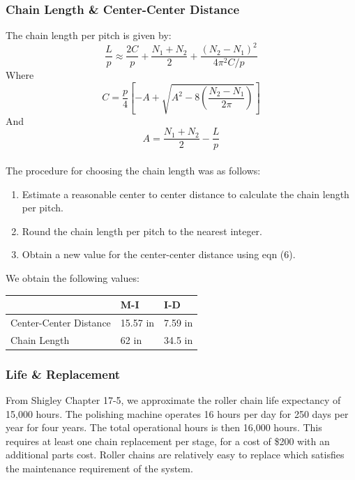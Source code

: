 \documentclass[letterpaper,12pt]{article}
\begin{document}
\subsubsection{Chain Length \& Center-Center Distance}
The chain length per pitch is given by:
\begin{equation}
\frac{L}{p} \approx \frac{2C}{p} + \frac{N_1 + N_2}{2} + \frac{(N_2 - N_1)^2}{4 \pi^2 C/p}
\end{equation}
Where
\begin{equation}
    C = \frac{p}{4}\left[-A + \sqrt{A^2 - 8\left(\frac{N_2 - N_1}{2 \pi}\right)}\right]
\end{equation}
And
\begin{equation}
    A = \frac{N_1 + N_2}{2} - \frac{L}{p}
\end{equation}
\\
The procedure for choosing the chain length was as follows:
\begin{enumerate}
    \itemsep0em
    \item Estimate a reasonable center to center distance to calculate the chain length per pitch.
    \item Round the chain length per pitch to the nearest integer.
    \item Obtain a new value for the center-center distance using eqn (6).
\end{enumerate}
We obtain the following values:

\begin{center}
	\begin{tabular}{|p{4cm}|p{1.5cm}|p{1.5cm}| }
		\hline
		& M-I & I-D \\
		\hline
		Center-Center Distance & 15.57 in & 7.59 in\\
		Chain Length & 62 in & 34.5 in\\
		\hline
	\end{tabular}
\end{center}

\subsubsection{Life \& Replacement}
From Shigley Chapter 17-5, we approximate the roller chain life expectancy of 15,000 hours. The polishing machine operates 16 hours per day for 250 days per year for four years. The total operational hours is then 16,000 hours. This requires at least one chain replacement per stage, for a cost of \$200 with an additional parts cost. Roller chains are relatively easy to replace which satisfies the maintenance requirement of the system. 
\end{document}
